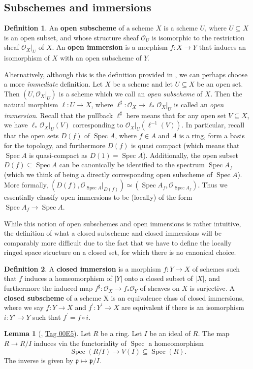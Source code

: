 \documentclass[oneside]{amsart}
\theoremstyle{definition}
\newtheorem{defi}{Definition}[section]
\newtheorem{lemma}{Lemma}[section]
\DeclareMathOperator{\spec}{Spec}
\begin{document}
\subsection{Subschemes and immersions}
\begin{defi}
An \textbf{open subscheme} of a scheme $X$ is a scheme $U$, where $U \subseteq X$ is an open subset, and whose structure sheaf $\mathscr O_U$ is isomorphic to the restriction sheaf $\mathscr O_X |_U$ of $X$. An \textbf{open immersion} is a morphism $f \colon X \to Y$ that induces an isomorphism of $X$ with an open subscheme of $Y$.
\end{defi}
Alternatively, although this is the definition provided in , we can perhaps choose a more \textit{immediate} definition. Let $X$ be a scheme and let $U \subseteq X$ be an open set. Then $(U, \mathscr O_X |_U)$ is a scheme which we call an \textit{open subscheme} of $X$. Then the natural morphism $\ell \colon U \to X$, where $\ell^\sharp \colon \mathscr O _X \to \ell _\ast \mathscr O_X|_U$ is called an \textit{open immersion}. Recall that the pullback $\ell ^\sharp$ here means that for any open set $V \subseteq X$, we have $\ell_\ast \mathscr O_X|_U(V)$ corresponding to $\mathscr O_X|_U(\ell^{-1}(V))$. In particular, recall that the open sets $D(f)$ of $\spec A$, where $f \in A$ and $A$ is a ring, form a basis for the topology, and furthermore $D(f)$ is quasi compact (which means that $\spec A$ is quasi-compact as $D(1) = \spec A$). Additionally, the open subset $D(f) \subseteq \spec A$ can be canonically be identified to the spectrum $\spec A_f$ (which we think of being a directly corresponding open subscheme of $\spec A$). More formally, $(D(f), \mathscr O_{\spec A}|_{D(f)} ) \simeq (\spec A_f, \mathscr O_{\spec A_f})$. Thus we essentially classify open immersions to be (locally) of the form $\spec A_f \to \spec A$.

While this notion of open subschemes and open immersions is rather intuitive, the definition of what a closed subscheme and closed immersions will be comparably more difficult due to the fact that we have to define the locally ringed space structure on a closed set, for which there is no canonical choice. 
\begin{defi}
 A \textbf{closed immersion} is a morphism $f\colon Y \to X$ of schemes such that $f$ induces a homeomorphism of $|Y|$ onto a closed subset of $|X |$, and furthermore the induced map $f ^{\sharp} \colon \mathscr O _X \to f _{\ast} \mathscr O _Y$ of sheaves on $X$ is surjective. A \textbf{closed subscheme} of a scheme X is an equivalence class of closed immersions, where we say $f \colon Y \to X$ and $f ^{\prime} \colon Y ^{\prime} \to X$ are equivalent if there is an isomorphism $i \colon Y' \to Y$ such that $f ^{\prime} = f \circ i$.
\end{defi}
\begin{lemma}[, \href{https://stacks.math.columbia.edu/tag/00E5}{Tag 00E5}] Let $R$ be a ring. Let $I$ be an ideal of $R$. The map $R \to R/I$ induces via the functoriality of $\spec$ a homeomorphism 
\[
\spec (R/I) \to V(I) \subseteq \spec (R).
\] The inverse is given by $\mathfrak p \mapsto \mathfrak p /I$.
\end{lemma}
\end{document}
